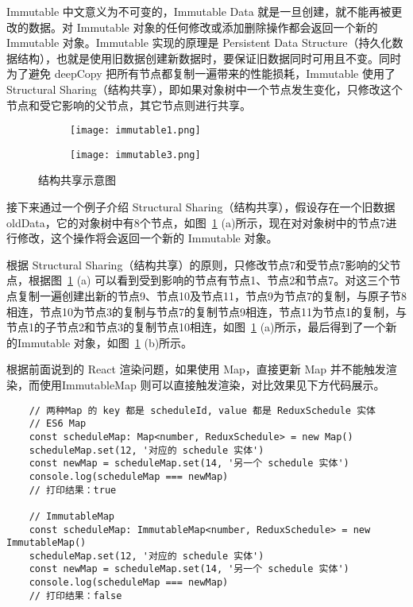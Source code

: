 Immutable 中文意义为不可变的，Immutable Data 就是一旦创建，就不能再被更改的数据。对 Immutable 对象的任何修改或添加删除操作都会返回一个新的 Immutable 对象。Immutable 实现的原理是 Persistent Data Structure（持久化数据结构），也就是使用旧数据创建新数据时，要保证旧数据同时可用且不变。同时为了避免 deepCopy 把所有节点都复制一遍带来的性能损耗，Immutable 使用了 Structural Sharing（结构共享），即如果对象树中一个节点发生变化，只修改这个节点和受它影响的父节点，其它节点则进行共享。

\begin{figure}[!htp]
    \centering
    \begin{subfigure}{1\textwidth}
      \centering
      \texttt{[image: immutable1.png]}
      \caption{}
    \end{subfigure}
    \begin{subfigure}{1\textwidth}
      \centering
      \texttt{[image: immutable3.png]}
      \caption{}
    \end{subfigure}
    \caption{结构共享示意图}
    \label{fig:immutable}
  \end{figure}

  接下来通过一个例子介绍 Structural Sharing（结构共享），假设存在一个旧数据 oldData，它的对象树中有8个节点，如图~\ref{fig:immutable} (a)所示，现在对对象树中的节点7进行修改，这个操作将会返回一个新的 Immutable 对象。

   根据 Structural Sharing（结构共享）的原则，只修改节点7和受节点7影响的父节点，根据图~\ref{fig:immutable} (a) 可以看到受到影响的节点有节点1、节点2和节点7。对这三个节点复制一遍创建出新的节点9、节点10及节点11，节点9为节点7的复制，与原子节8相连，节点10为节点3的复制与节点7的复制节点9相连，节点11为节点1的复制，与节点1的子节点2和节点3的复制节点10相连，如图~\ref{fig:immutable} (a)所示，最后得到了一个新的Immutable 对象，如图~\ref{fig:immutable} (b)所示。

  根据前面说到的 React 渲染问题，如果使用 Map，直接更新 Map 并不能触发渲染，而使用ImmutableMap 则可以直接触发渲染，对比效果见下方代码展示。

  {\setmainfont{Courier New Bold}
  \begin{lstlisting}
    // 两种Map 的 key 都是 scheduleId, value 都是 ReduxSchedule 实体
    // ES6 Map
    const scheduleMap: Map<number, ReduxSchedule> = new Map()
    scheduleMap.set(12, '对应的 schedule 实体')
    const newMap = scheduleMap.set(14, '另一个 schedule 实体')
    console.log(scheduleMap === newMap)
    // 打印结果：true

    // ImmutableMap
    const scheduleMap: ImmutableMap<number, ReduxSchedule> = new ImmutableMap()
    scheduleMap.set(12, '对应的 schedule 实体')
    const newMap = scheduleMap.set(14, '另一个 schedule 实体')
    console.log(scheduleMap === newMap)
    // 打印结果：false
   \end{lstlisting}}

